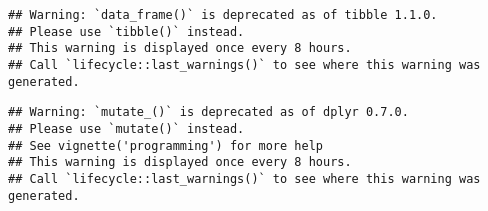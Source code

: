 \documentclass[
]{article}
\newenvironment{Shaded}{\begin{snugshade}}{\end{snugshade}}
\newcommand{\DataTypeTok}[1]{\textcolor[rgb]{0.13,0.29,0.53}{#1}}
\newcommand{\DecValTok}[1]{\textcolor[rgb]{0.00,0.00,0.81}{#1}}
\newcommand{\FloatTok}[1]{\textcolor[rgb]{0.00,0.00,0.81}{#1}}
\newcommand{\KeywordTok}[1]{\textcolor[rgb]{0.13,0.29,0.53}{\textbf{#1}}}
\newcommand{\NormalTok}[1]{#1}
\newcommand{\OperatorTok}[1]{\textcolor[rgb]{0.81,0.36,0.00}{\textbf{#1}}}
\newcommand{\OtherTok}[1]{\textcolor[rgb]{0.56,0.35,0.01}{#1}}
\newcommand{\StringTok}[1]{\textcolor[rgb]{0.31,0.60,0.02}{#1}}
\begin{document}
\begin{Shaded}
\end{Shaded}

\begin{verbatim}
## Warning: `data_frame()` is deprecated as of tibble 1.1.0.
## Please use `tibble()` instead.
## This warning is displayed once every 8 hours.
## Call `lifecycle::last_warnings()` to see where this warning was generated.
\end{verbatim}

\begin{verbatim}
## Warning: `mutate_()` is deprecated as of dplyr 0.7.0.
## Please use `mutate()` instead.
## See vignette('programming') for more help
## This warning is displayed once every 8 hours.
## Call `lifecycle::last_warnings()` to see where this warning was generated.
\end{verbatim}
\end{document}
